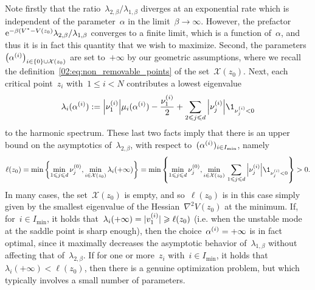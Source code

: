     Note firstly that the ratio~$\lambda_{2,\beta}/\lambda_{1,\beta}$ diverges at an exponential rate which is independent of the parameter~$\alpha$ in the limit~$\beta\to\infty$. However, the prefactor~$\mathrm{e}^{-\beta(V^*-V(z_0)}\lambda_{2,\beta}/\lambda_{1,\beta}$ converges to a finite limit, which is a function of~$\alpha$, and thus it is in fact this quantity that we wish to maximize.
    Second, the parameters~$\left(\alpha^{(i)}\right)_{i\in\{0\}\cup\mathcal X(z_0)}$ are set to~$+\infty$ by our geometric assumptions, where we recall the definition~\eqref{02:eq:non_removable_points} of the set~$\mathcal X(z_0)$.
    Next, each critical point~$z_i$ with~$1\leq i<N$ contributes a lowest eigenvalue
    \[\lambda_i(\alpha^{(i)}) := \abs{\hessEigval{i}{1}}\mu_i(\alpha^{(i)})-\frac{\hessEigval{i}{1}}2 + \sum_{2\leq j\leq d}\abs{\hessEigval{i}{j}}\1_{\hessEigval{i}{j}<0}\]
    to the harmonic spectrum.
    These last two facts imply that there is an upper bound on the asymptotics of~$\lambda_{2,\beta}$, with respect to~$(\alpha^{(i)})_{i\in I_{\min}}$, namely
    \begin{equation}
        \label{02:eq:upper_bound}
        \ell(z_0)  = \min\left\{\underset{1\leq j\leq d}{\min}\,\hessEigval{0}{j},\underset{i\in\mathcal X(z_0)}{\min}\,\lambda_i(+\infty)\right\}=\min\left\{\underset{1\leq j\leq d}{\min}\,\hessEigval{0}{j},\underset{i\in\mathcal X(z_0)}{\min}\,\sum_{1\leq j\leq d}\abs{\hessEigval{i}{j}}\1_{\hessEigval{i}{j}<0}\right\}>0.
    \end{equation}
    In many cases, the set~$\mathcal X(z_0)$ is empty, and so~$\ell(z_0)$ is in this case simply given by the smallest eigenvalue of the Hessian~$\nabla^2 V(z_0)$ at the minimum.
    If, for~$i\in I_{\min}$, it holds that~$\lambda_i(+\infty)=|v^{(i)}_{1}|\geqslant\ell(z_0)$ (i.e. when the unstable mode at the saddle point is sharp enough), then the choice~$\alpha^{(i)}=+\infty$ is in fact optimal, since it maximally decreases the asymptotic behavior of~$\lambda_{1,\beta}$ without affecting that of~$\lambda_{2,\beta}$.
    If for one or more~$z_i$ with~$i\in I_{\min}$, it holds that~$\lambda_i(+\infty)<\ell(z_0)$, then there is a genuine optimization problem, but which typically involves a small number of parameters.
    
